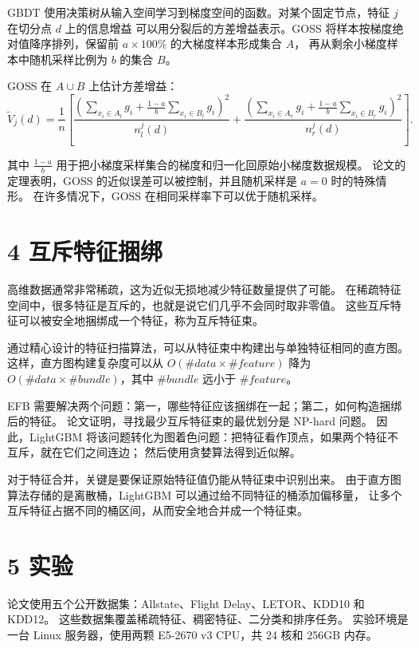 GBDT 使用决策树从输入空间学习到梯度空间的函数。对某个固定节点，特征 $j$ 在切分点 $d$ 上的信息增益
可以用分裂后的方差增益表示。GOSS 将样本按梯度绝对值降序排列，保留前 $a\times 100\%$ 的大梯度样本形成集合 $A$，
再从剩余小梯度样本中随机采样比例为 $b$ 的集合 $B$。

GOSS 在 $A\cup B$ 上估计方差增益：
\[
  \tilde{V}_j(d)
  =
  \frac{1}{n}
  \left[
    \frac{
      \left(
        \sum_{x_i\in A_l}g_i
        +
        \frac{1-a}{b}\sum_{x_i\in B_l}g_i
      \right)^2
    }{n_l^j(d)}
    +
    \frac{
      \left(
        \sum_{x_i\in A_r}g_i
        +
        \frac{1-a}{b}\sum_{x_i\in B_r}g_i
      \right)^2
    }{n_r^j(d)}
  \right].
\]

其中 $\frac{1-a}{b}$ 用于把小梯度采样集合的梯度和归一化回原始小梯度数据规模。
论文的定理表明，GOSS 的近似误差可以被控制，并且随机采样是 $a=0$ 时的特殊情形。
在许多情况下，GOSS 在相同采样率下可以优于随机采样。

\section{4 互斥特征捆绑}

高维数据通常非常稀疏，这为近似无损地减少特征数量提供了可能。
在稀疏特征空间中，很多特征是互斥的，也就是说它们几乎不会同时取非零值。
这些互斥特征可以被安全地捆绑成一个特征，称为互斥特征束。

通过精心设计的特征扫描算法，可以从特征束中构建出与单独特征相同的直方图。
这样，直方图构建复杂度可以从
$O(\#data\times \#feature)$ 降为
$O(\#data\times \#bundle)$，其中 $\#bundle$ 远小于 $\#feature$。

EFB 需要解决两个问题：第一，哪些特征应该捆绑在一起；第二，如何构造捆绑后的特征。
论文证明，寻找最少互斥特征束的最优划分是 NP-hard 问题。
因此，LightGBM 将该问题转化为图着色问题：把特征看作顶点，如果两个特征不互斥，就在它们之间连边；
然后使用贪婪算法得到近似解。

对于特征合并，关键是要保证原始特征值仍能从特征束中识别出来。
由于直方图算法存储的是离散桶，LightGBM 可以通过给不同特征的桶添加偏移量，
让多个互斥特征占据不同的桶区间，从而安全地合并成一个特征束。

\section{5 实验}

论文使用五个公开数据集：Allstate、Flight Delay、LETOR、KDD10 和 KDD12。
这些数据集覆盖稀疏特征、稠密特征、二分类和排序任务。
实验环境是一台 Linux 服务器，使用两颗 E5-2670 v3 CPU，共 24 核和 256GB 内存。

